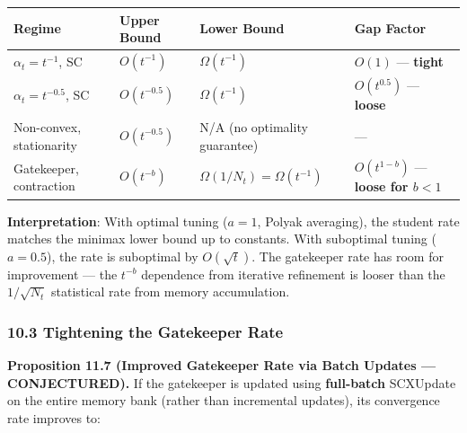 \documentclass[
  12pt,
]{ctexart}
\begin{document}
\begin{longtable}[]{@{}
  >{\raggedright\arraybackslash}p{}
  >{\raggedright\arraybackslash}p{}
  >{\raggedright\arraybackslash}p{}
  >{\raggedright\arraybackslash}p{}@{}}
\toprule\noalign{}
\begin{minipage}[b]{\linewidth}\raggedright
Regime
\end{minipage} & \begin{minipage}[b]{\linewidth}\raggedright
Upper Bound
\end{minipage} & \begin{minipage}[b]{\linewidth}\raggedright
Lower Bound
\end{minipage} & \begin{minipage}[b]{\linewidth}\raggedright
Gap Factor
\end{minipage} \\
\midrule\noalign{}
\endhead
\bottomrule\noalign{}
\endlastfoot
\(\alpha_t = t^{-1}\), SC & \(O(t^{-1})\) & \(\Omega(t^{-1})\) &
\(O(1)\) --- \textbf{tight} \\
\(\alpha_t = t^{-0.5}\), SC & \(O(t^{-0.5})\) & \(\Omega(t^{-1})\) &
\(O(t^{0.5})\) --- \textbf{loose} \\
Non-convex, stationarity & \(O(t^{-0.5})\) & N/A (no optimality
guarantee) & --- \\
Gatekeeper, contraction & \(O(t^{-b})\) &
\(\Omega(1/N_t) = \Omega(t^{-1})\) & \(O(t^{1-b})\) --- \textbf{loose
for \(b < 1\)} \\
\end{longtable}

\textbf{Interpretation}: With optimal tuning (\(a = 1\), Polyak
averaging), the student rate matches the minimax lower bound up to
constants. With suboptimal tuning (\(a = 0.5\)), the rate is suboptimal
by \(O(\sqrt{t})\). The gatekeeper rate has room for improvement --- the
\(t^{-b}\) dependence from iterative refinement is looser than the
\(1/\sqrt{N_t}\) statistical rate from memory accumulation.

\subsubsection{10.3 Tightening the Gatekeeper
Rate}\label{tightening-the-gatekeeper-rate}

\textbf{Proposition 11.7 (Improved Gatekeeper Rate via Batch Updates ---
CONJECTURED).} If the gatekeeper is updated using \textbf{full-batch}
SCXUpdate on the entire memory bank (rather than incremental updates),
its convergence rate improves to:
\end{document}
